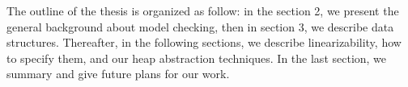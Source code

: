 The outline of the thesis  is organized as follow: in the section 2, we present the general background about model checking, then in section 3, we describe data structures. Thereafter, in the following sections, we describe linearizability, how to specify them, and our heap abstraction techniques. In the last section, we summary  and give future plans for our work.
